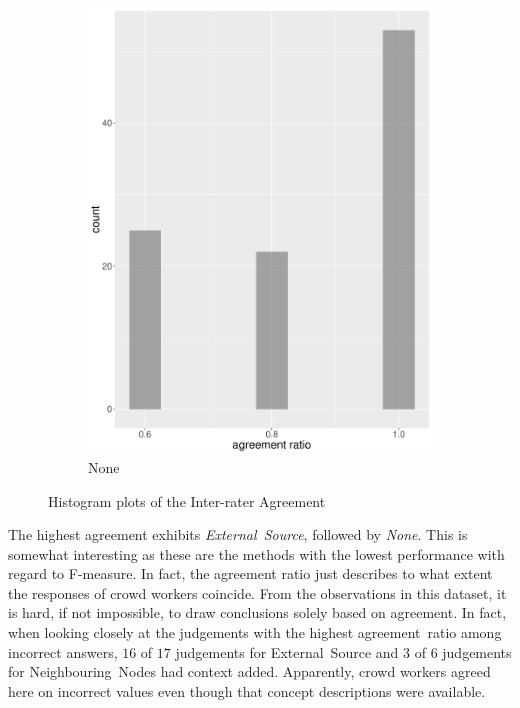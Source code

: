 \begin{figure}
\begin{subfigure}[b]{0.4\textwidth}
        \includegraphics[width=\textwidth]{plots/hist_agreement_none}
        \caption{None}
        \label{fig:hist_agreement_none}
    \end{subfigure}
    \caption{Histogram plots of the Inter-rater Agreement}\label{fig:hist_agreement_all}
\end{figure}

The highest agreement exhibits \emph{External~Source}, followed by \emph{None}. This is somewhat interesting as these are the methods with the lowest performance with regard to F-measure. In fact, the agreement ratio just describes to what extent the responses of crowd workers coincide. From the observations in this dataset, it is hard, if not impossible, to draw conclusions solely based on agreement. In fact, when looking closely at the judgements with the highest agreement~ratio among incorrect answers, $16$ of $17$ judgements for External~Source and $3$ of $6$ judgements for Neighbouring~Nodes had context added. Apparently, crowd workers agreed here on incorrect values even though that concept descriptions were available. 

